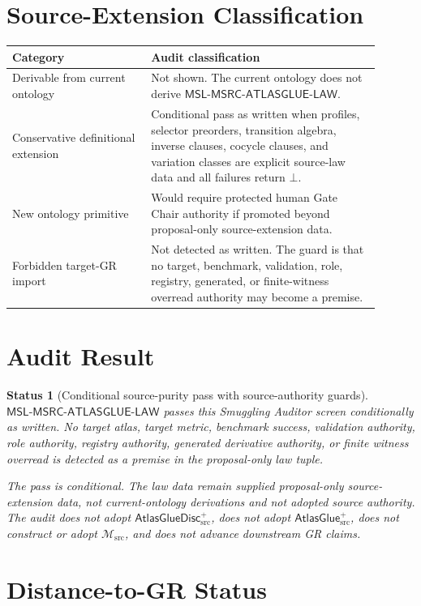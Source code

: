 \documentclass[11pt]{article}
\newcommand{\Msrc}{\mathcal{M}_{\mathrm{src}}}
\newcommand{\AtlasGlue}{\mathsf{AtlasGlue}_{\mathrm{src}}^{+}}
\newcommand{\AtlasGlueDisc}{\mathsf{AtlasGlueDisc}_{\mathrm{src}}^{+}}
\newcommand{\MSL}{\mathsf{MSL}\mbox{-}\mathsf{MSRC}\mbox{-}\mathsf{ATLASGLUE}\mbox{-}\mathsf{LAW}}
\newcommand{\Bot}{\bot}
\newtheorem{status}{Status}
\begin{document}
\section{Source-Extension Classification}

\begin{center}
\begin{tabular}{p{0.34\linewidth}p{0.56\linewidth}}
\hline
Category & Audit classification \\
\hline
Derivable from current ontology & Not shown. The current ontology does not
derive \(\MSL\). \\
Conservative definitional extension & Conditional pass as written when
profiles, selector preorders, transition algebra, inverse clauses, cocycle
clauses, and variation classes are explicit source-law data and all failures
return \(\Bot\). \\
New ontology primitive & Would require protected human Gate Chair authority
if promoted beyond proposal-only source-extension data. \\
Forbidden target-GR import & Not detected as written. The guard is that no
target, benchmark, validation, role, registry, generated, or finite-witness
overread authority may become a premise. \\
\hline
\end{tabular}
\end{center}

\section{Audit Result}

\begin{status}[Conditional source-purity pass with source-authority guards]
\(\MSL\) passes this Smuggling Auditor screen conditionally as written. No
target atlas, target metric, benchmark success, validation authority, role
authority, registry authority, generated derivative authority, or finite
witness overread is detected as a premise in the proposal-only law tuple.

The pass is conditional. The law data remain supplied proposal-only
source-extension data, not current-ontology derivations and not adopted source
authority. The audit does not adopt \(\AtlasGlueDisc\), does not adopt
\(\AtlasGlue\), does not construct or adopt \(\Msrc\), and does not advance
downstream GR claims.
\end{status}

\section{Distance-to-GR Status}
\end{document}
